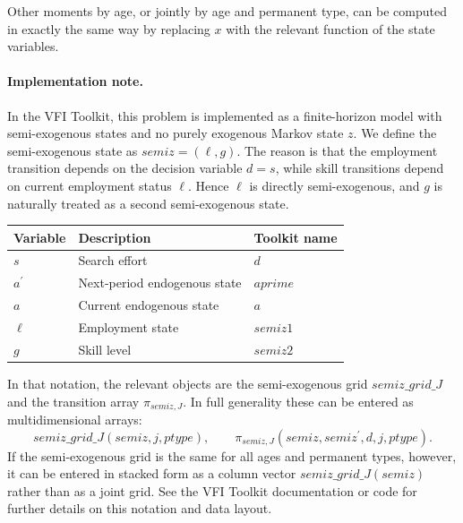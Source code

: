 \documentclass[11pt]{article}
\begin{document}
Other moments by age, or jointly by age and permanent type, can be computed
in exactly the same way by replacing $x$ with the relevant function of the
state variables.

\paragraph{Implementation note.}

In the VFI Toolkit, this problem is implemented as a finite-horizon model
with semi-exogenous states and no purely exogenous Markov state $z$. We
define the semi-exogenous state as $semiz=(\ell ,g)$. The reason is that the
employment transition depends on the decision variable $d=s$, while skill
transitions depend on current employment status $\ell$. Hence $\ell$ is
directly semi-exogenous, and $g$ is naturally treated as a second
semi-exogenous state.

\begin{center}
\begin{tabular}{lll}
\toprule
Variable & Description & Toolkit name \\
\midrule
$s$ & Search effort & $d$ \\
$a^{\prime }$ & Next-period endogenous state & $aprime$ \\
$a$ & Current endogenous state & $a$ \\
$\ell$ & Employment state & $semiz1$ \\
$g$ & Skill level & $semiz2$ \\
\bottomrule
\end{tabular}
\end{center}

In that notation, the relevant objects are the semi-exogenous grid
$semiz\_grid\_J$ and the transition array $\pi _{semiz,J}$. In full
generality these can be entered as multidimensional arrays:
\begin{equation*}
semiz\_grid\_J(semiz,j,ptype), \qquad \pi _{semiz,J}(semiz,semiz^{\prime },d,j,ptype).
\end{equation*}
If the semi-exogenous grid is the same for all ages and permanent types,
however, it can be entered in stacked form as a column vector
$semiz\_grid\_J(semiz)$ rather than as a joint grid. See the VFI Toolkit
documentation or code for further details on this notation and data layout.
\end{document}
